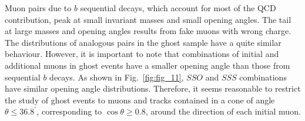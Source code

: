 \documentclass[aps,prd,preprint,floatfix,nofootinbib,superscriptaddress,showpacs,amssymb]{revtex4}
\def\deg{^\circ}
\begin{document}
 Muon pairs due to $b$ sequential decays, which account for most of the QCD
 contribution, peak at small invariant masses and small opening angles. 
 The tail at large masses and opening angles results from fake muons
 with  wrong charge. The distributions of analogous pairs in the
 ghost sample have a quite similar behaviour. However, it is
 important to note that combinations of initial and additional muons
 in ghost events have a smaller opening angle than those from sequential
 $b$ decays. As shown in Fig.~\ref{fig:fig_11}, $SSO$ and $SSS$
 combinations have similar opening angle distributions. Therefore, it seems
 reasonable to restrict the study of ghost events to muons and tracks 
 contained in a cone of angle $\theta \leq 36.8^{\deg}$, corresponding to
 $\cos \theta \geq 0.8$, around the direction of each initial muon.
\end{document}
